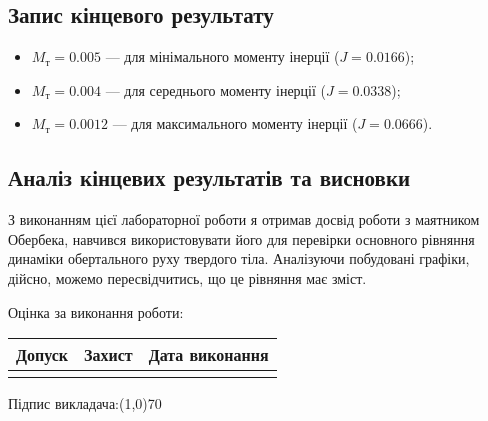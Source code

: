 \documentclass[12pt]{article}
\begin{document}
{\fontsize{14}{16.2}\selectfont

\subsection*{Запис кінцевого результату}

\begin{itemize}
	\item $M_\textrm{т}=0.005$ --- для мінімального моменту інерції ($J=0.0166$);
	\item $M_\textrm{т}=0.004$ --- для середнього моменту інерції ($J=0.0338$);
	\item $M_\textrm{т}=0.0012$ --- для максимального моменту інерції ($J=0.0666$).
\end{itemize}

\subsection*{Аналіз кінцевих результатів та висновки}

	З виконанням цієї лабораторної роботи я отримав досвід
	роботи з маятником Обербека, навчився використовувати
	його для перевірки основного рівняння динаміки обертального
	руху твердого тіла. Аналізуючи побудовані графіки, дійсно,
	можемо пересвідчитись, що це рівняння має зміст.

	\newpage
	\hphantom{10pt}
\vspace{550pt}

Оцінка за виконання роботи:
\smallskip

\renewcommand{\arraystretch}{4}
\begin{tabular}{|c|c|c|}
	\hline
	\hspace{15pt} Допуск \hspace{15pt} & \hspace{15pt} Захист \hspace{15pt}
	& \hspace{15pt} Дата виконання \hspace{15pt}\\
	\hline
	 &  & \\
	\hline

\end{tabular}

\bigskip

	\begin{flushright}
		Підпис викладача:\line(1,0){70}\hspace{100pt}\hphantom{1pt}
	\end{flushright}
	}
\end{document}
